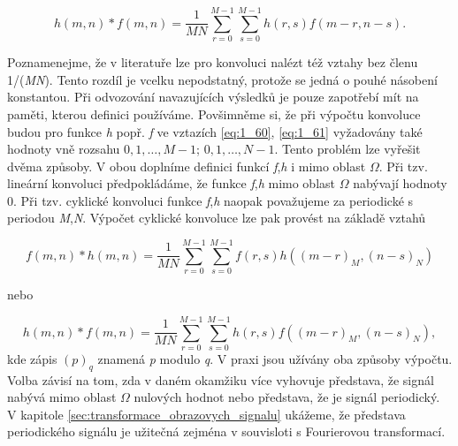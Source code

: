 \begin{equation} \label{eq:1_61}
    h(m, n) \ast f(m, n) = \frac{1}{MN} \sum\limits_{r=0}^{M-1} \sum\limits_{s=0}^{M-1} h(r, s) f(m - r, n - s).
\end{equation}

Poznamenejme, že v literatuře lze pro konvoluci nalézt též vztahy bez členu 1/(\textit{MN}). Tento rozdíl je vcelku nepodstatný, protože se jedná o pouhé násobení konstantou. Při odvozování navazujících výsledků je pouze zapotřebí mít na paměti, kterou definici používáme. Povšimněme si, že při výpočtu konvoluce budou pro funkce \textit{h} popř. \textit{f}  ve vztazích \eqref{eq:1_60}, \eqref{eq:1_61} vyžadovány také hodnoty vně rozsahu $0, 1, \dots, M-1$; $0, 1, \dots, N-1$. Tento problém lze vyřešit dvěma způsoby. V obou doplníme definici funkcí \textit{f},\textit{h} i mimo oblast $\Omega$. Při tzv. lineární konvoluci předpokládáme, že funkce \textit{f},\textit{h} mimo oblast $\Omega$ nabývají hodnoty 0. Při tzv. cyklické konvoluci funkce \textit{f},\textit{h} naopak považujeme za periodické s periodou \textit{M},\textit{N}. Výpočet cyklické konvoluce lze pak provést na základě vztahů

\begin{equation} \label{eq:1_62}
    f(m, n) \ast h(m, n) = \frac{1}{MN} \sum\limits_{r=0}^{M-1} \sum\limits_{s=0}^{M-1} f(r, s) h\left( \left( m - r \right)_M, \left(n - s\right)_N \right)
\end{equation}

\noindent nebo

\begin{equation} \label{eq:1_63}
    h(m, n) \ast f(m, n) = \frac{1}{MN} \sum\limits_{r=0}^{M-1} \sum\limits_{s=0}^{M-1} h(r, s) f\left( \left( m - r\right)_M, \left(n - s\right)_N \right),
\end{equation}
kde zápis $(p)_q$ znamená \textit{p} modulo \textit{q}. V praxi jsou užívány oba způsoby výpočtu. Volba závisí na tom, zda v daném okamžiku více vyhovuje představa, že signál nabývá mimo oblast $\Omega$ nulových hodnot nebo představa, že je signál periodický. V kapitole \ref{sec:transformace_obrazovych_signalu} ukážeme, že představa periodického signálu je užitečná zejména v souvisloti s Fourierovou transformací.

